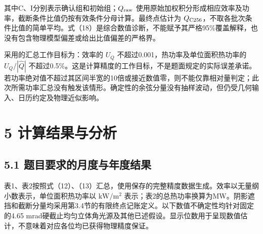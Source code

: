 \documentclass[UTF8,fontset=windows,zihao=-4]{ctexart}
\begin{document}
其中C、I分别表示确认组和初始组；\(Q_{\rm raw}\) 使用原始加权积分形成相应效率及功率，截断条件比值仍按有效条件分母计算。最终点估计为 \(Q_{\rm C256}\)，不取各批次条件比值的简单平均。式（18）是综合数值诊断，不能赋予其严格95\%覆盖解释，也没有包含物理模型偏差或给出比值偏差的严格界。

采用的汇总工作目标为：效率的 \(U_Q\) 不超过0.001，热功率及单位面积热功率的 \(U_Q/|\widehat Q|\) 不超过0.5\%。这是计算精度的工作目标，不是题面规定的实际误差承诺。若功率绝对值不超过其区间半宽的10倍或接近数值零，则不能仅靠相对量判定；此次所需功率汇总没有触发该情形。确定性的余弦分量没有抽样波动，但仍受几何输入、日历约定及物理近似影响。

\section*{5 计算结果与分析}

\subsection*{5.1 题目要求的月度与年度结果}

表1、表2按照式（12）、（13）汇总，使用保存的完整精度数据生成。效率以无量纲小数表示，单位面积热功率以 \(\mathrm{kW/m^2}\) 表示；表2的总热功率换算为MW。阴影遮挡和截断分量均采用第3.4节的有限终点记账定义。以下数值不确定性均针对固定的4.65 mrad硬截止均匀立体角光源及其他已述假设。显示位数用于呈现数值估计，不意味着对应各位均已获得物理精度保证。
\end{document}
